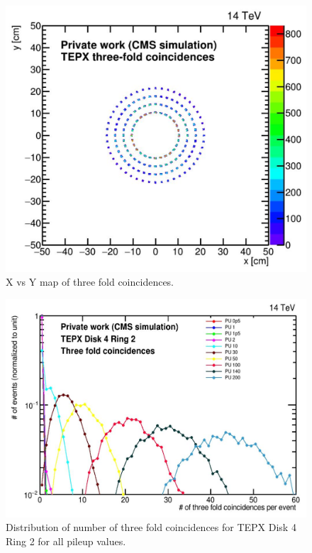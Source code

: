 \begin{figure}[H]
  \centering
  \includegraphics[width=0.5\columnwidth]{ashish_thesis/tepx_threefold_coincidences.png}
  \caption[Regions in XY plane showing three-fold coincidences]{X vs Y map of three fold coincidences.}
  \label{fig:tepx_3foldcoin_allPU_1}
\end{figure}

\newpage
\begin{figure}[H]
  \centering
  \includegraphics[width=0.7\columnwidth]{ashish_thesis/tepx_threefold_allpu.png}
  \caption[TEPX Disk 4 Ring 2 Three Fold Coincidences]{Distribution of number of three fold coincidences for TEPX Disk 4 Ring 2 for all pileup values.}
  \label{fig:tepx_3foldcoin_allPU_2}
\end{figure}


